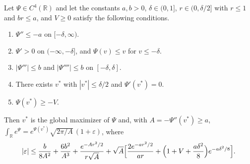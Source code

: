 \begin{lema}\label{lem:torres-laplace}
Let $\Psi\in C^4(\mathbb R)$ and let the constants $a,b>0$, $\delta\in(0,1]$, $r\in(0,\delta/2]$ with
$r\le1$ and
$br\le a$, and $V\ge0$ satisfy the following conditions.
\begin{enumerate}[label=(L\arabic*)]
\item $\Psi''\le-a$ on $[-\delta,\infty)$.
\item $\Psi'>0$ on $(-\infty,-\delta]$, and $\Psi(v)\le v$ for $v\le-\delta$.
\item $|\Psi'''|\le b$ and $|\Psi''''|\le b$ on $[-\delta,\delta]$.
\item There exists $v^*$ with $|v^*|\le\delta/2$ and $\Psi'(v^*)=0$.
\item $\Psi(v^*)\ge-V$.
\end{enumerate}
Then $v^*$ is the global maximizer of $\Psi$ and, with $A=-\Psi''(v^*)\ge a$,
$\int_{\mathbb R}e^{\Psi}=e^{\Psi(v^*)}\sqrt{2\pi/A}\,(1+\varepsilon)$, where
\[
 |\varepsilon|\le\frac b{8A^2}+\frac{6b^2}{A^3}+\frac{e^{-Ar^2/2}}{r\sqrt A}
 +\sqrt A\Bigl[\frac{2e^{-ar^2/2}}{ar}+\Bigl(1+V+\frac{a\delta^2}8\Bigr)e^{-a\delta^2/8}\Bigr].
\]
\end{lema}
